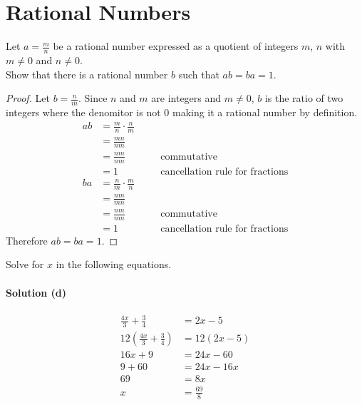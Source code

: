 \documentclass[6pt]{article}
\begin{document}
\section{Rational Numbers}

\begin{tcolorbox}[title=Problem 4, breakable]
Let $a = \frac{m}{n}$ be a rational number expressed as a quotient of integers $m$, $n$
with $m \not = 0$ and $n \not = 0$. \\
Show that there is a rational number $b$ such that $ab = ba = 1$.
\end{tcolorbox}

\begin{proof}
Let $b = \frac{n}{m}$. Since $n$ and $m$ are integers and $m \not = 0$, 
$b$ is the ratio of two integers where the denomitor is not $0$ 
making it a rational number by definition.
\begin{align*}
ab &= \frac{m}{n} \cdot \frac{n}{m} && \\
&= \frac{mn}{nm} && \\
&= \frac{nm}{nm} && \quad \text{commutative} \\
&= 1 && \quad \text{cancellation rule for fractions}
\end{align*}
\begin{align*}
ba &= \frac{n}{m} \cdot \frac{m}{n} && \\
&= \frac{nm}{mn} && \\
&= \frac{nm}{nm} && \quad \text{commutative} \\
&= 1 && \quad \text{cancellation rule for fractions}
\end{align*}
Therefore $ab = ba = 1$.
\end{proof}

\begin{tcolorbox}[title=Problem 6, breakable]
Solve for $x$ in the following equations.
\end{tcolorbox}

\paragraph{Solution (d)}
\begin{align*}
\frac{4x}{3} + \frac{3}{4} &= 2x - 5 \\
12\left(\frac{4x}{3} + \frac{3}{4}\right) &= 12(2x - 5) \\
16x + 9 &= 24x - 60 \\
9 + 60 &= 24x - 16x \\
69 &= 8x \\
x &= \frac{69}{8}
\end{align*}
\end{document}
